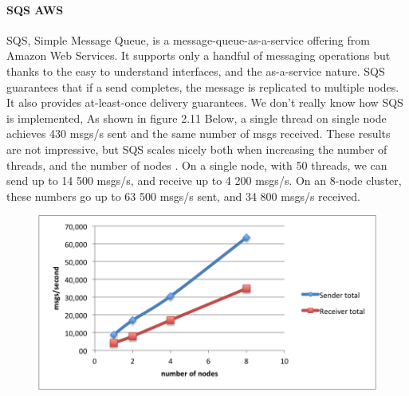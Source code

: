 \paragraph{SQS AWS}
\label{sec:sec01}
SQS, Simple Message Queue, is a message-queue-as-a-service offering from Amazon Web Services.
 It supports only a handful of messaging operations but 
 thanks to the easy to understand interfaces, and the as-a-service nature.
SQS guarantees that if a send completes, the message is replicated to multiple nodes.
 It also provides at-least-once delivery guarantees. We don't really know how SQS is implemented,
As shown in figure 2.11 Below, a single thread on single node achieves 430 msgs/s sent and the same number of msgs received.
These results are not impressive, 
but SQS scales nicely both when increasing the number of threads, and the number of nodes
. On a single node, with 50 threads, we can send up to 14 500 msgs/s, and receive up to 4 200 msgs/s.
On an 8-node cluster, these numbers go up to 63 500 msgs/s sent, and 34 800 msgs/s received.
\begin{figure}[h!]
	\centering
	\includegraphics[height=0.2\textheight]{fig01/SQS}
	\label{fig:FilialesEtClients}
\end{figure}
